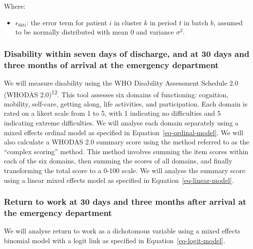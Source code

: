 \documentclass[
]{scrartcl}
\providecommand{\tightlist}{%
  \setlength{\itemsep}{0pt}\setlength{\parskip}{0pt}}\usepackage{longtable,booktabs,array}
\begin{document}
Where:

\begin{itemize}
\tightlist
\item
  \(\epsilon_{bkti}\): the error term for patient \(i\) in cluster \(k\)
  in period \(t\) in batch \(b\), assumed to be normally distributed
  with mean 0 and variance \(\sigma^2\).
\end{itemize}

\hypertarget{disability-within-seven-days-of-discharge-and-at-30-days-and-three-months-of-arrival-at-the-emergency-department}{%
\subsubsection{Disability within seven days of discharge, and at 30 days
and three months of arrival at the emergency
department}\label{disability-within-seven-days-of-discharge-and-at-30-days-and-three-months-of-arrival-at-the-emergency-department}}

We will measure disability using the WHO Disability Assessment Schedule
2.0 (WHODAS 2.0)\textsuperscript{12}. This tool assesses six domains of
functioning: cognition, mobility, self-care, getting along, life
activities, and participation. Each domain is rated on a likert scale
from 1 to 5, with 1 indicating no difficulties and 5 indicating extreme
difficulties. We will analyse each domain separately using a mixed
effects ordinal model as specified in Equation~\ref{eq-ordinal-model}.
We will also calculate a WHODAS 2.0 summary score using the method
referred to as the ``complex scoring'' method. This method involves
summing the item scores within each of the six domains, then summing the
scores of all domains, and finally transforming the total score to a
0-100 scale. We will analyse the summary score using a linear mixed
effects model as specified in Equation~\ref{eq-linear-model}.

\hypertarget{return-to-work-at-30-days-and-three-months-after-arrival-at-the-emergency-department}{%
\subsubsection{Return to work at 30 days and three months after arrival
at the emergency
department}\label{return-to-work-at-30-days-and-three-months-after-arrival-at-the-emergency-department}}

We will analyse return to work as a dichotomous variable using a mixed
effects binomial model with a logit link as specified in
Equation~\ref{eq-logit-model}.
\end{document}
